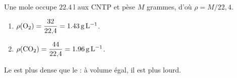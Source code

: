 \documentclass[11pt,a4paper]{article}
\begin{document}
\begin{corrige}
Une mole occupe $\SI{22.4}{\litre}$ aux CNTP et pèse $M$ grammes, d'où $\rho = M/22{,}4$.
\begin{enumerate}[label=\alph*)]
  \item $\rho(\ce{O2}) = \dfrac{32}{22{,}4} = \SI{1.43}{\gram\per\litre}$.
  \item $\rho(\ce{CO2}) = \dfrac{44}{22{,}4} = \SI{1.96}{\gram\per\litre}$.
\end{enumerate}
Le  est plus dense que le  : à volume égal, il est plus lourd.
\end{corrige}
\end{document}
